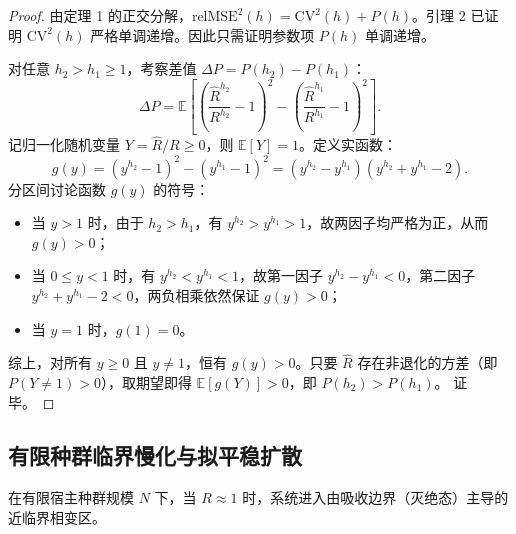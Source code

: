 \documentclass[11pt,a4paper]{article}
\theoremstyle{plain}
\theoremstyle{definition}
\begin{document}
\begin{proof}
由定理 1 的正交分解，$\text{relMSE}^2(h) = \text{CV}^2(h) + P(h)$。引理 2 已证明 $\text{CV}^2(h)$ 严格单调递增。因此只需证明参数项 $P(h)$ 单调递增。

对任意 $h_2 > h_1 \ge 1$，考察差值 $\Delta P = P(h_2) - P(h_1)$：
\begin{equation}
\Delta P = \mathbb{E}\left[ \left(\frac{\hat{R}^{h_2}}{R^{h_2}} - 1\right)^2 - \left(\frac{\hat{R}^{h_1}}{R^{h_1}} - 1\right)^2 \right].
\end{equation}
记归一化随机变量 $Y = \hat{R}/R \ge 0$，则 $\mathbb{E}[Y] = 1$。定义实函数：
\begin{equation}
g(y) = (y^{h_2} - 1)^2 - (y^{h_1} - 1)^2 = (y^{h_2} - y^{h_1})(y^{h_2} + y^{h_1} - 2).
\end{equation}
分区间讨论函数 $g(y)$ 的符号：
\begin{itemize}
\item 当 $y > 1$ 时，由于 $h_2 > h_1$，有 $y^{h_2} > y^{h_1} > 1$，故两因子均严格为正，从而 $g(y) > 0$；
\item 当 $0 \le y < 1$ 时，有 $y^{h_2} < y^{h_1} < 1$，故第一因子 $y^{h_2} - y^{h_1} < 0$，第二因子 $y^{h_2} + y^{h_1} - 2 < 0$，两负相乘依然保证 $g(y) > 0$；
\item 当 $y = 1$ 时，$g(1) = 0$。
\end{itemize}
综上，对所有 $y \ge 0$ 且 $y \neq 1$，恒有 $g(y) > 0$。只要 $\hat{R}$ 存在非退化的方差（即 $P(Y \neq 1) > 0$），取期望即得 $\mathbb{E}[g(Y)] > 0$，即 $P(h_2) > P(h_1)$。
证毕。
\end{proof}

\subsection{有限种群临界慢化与拟平稳扩散}

在有限宿主种群规模 $N$ 下，当 $R \approx 1$ 时，系统进入由吸收边界（灭绝态）主导的近临界相变区。
\end{document}
